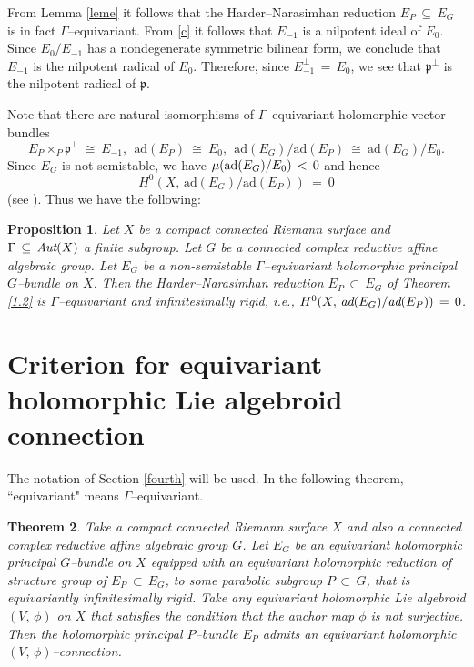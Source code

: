 \documentclass[12pt, reqno]{amsart}
\numberwithin{equation}{section}
\newtheorem{theorem}{Theorem}[section]
\newtheorem{proposition}[theorem]{Proposition}
\newcommand{\ad}{\textrm{ad}}
\begin{document}
{}From Lemma \ref{leme} it follows that the Harder--Narasimhan reduction $E_{P}\,\subseteq\, E_{G}$ is
in fact $\Gamma$--equivariant. From \eqref{c} it follows that $E_{-1}$ is a nilpotent ideal of $E_{0}$. Since
$E_{0}/E_{-1}$ has a nondegenerate symmetric bilinear form, we conclude that $E_{-1}$ is the nilpotent radical
of $E_{0}$. Therefore, since $E_{-1}^{\perp}\,=\,E_{0}$,
we see that $\mathfrak{p}^{\perp}$ is the nilpotent radical of $\mathfrak{p}$.

Note that there are natural isomorphisms of $\Gamma$--equivariant holomorphic
vector bundles $$E_{P}\times_{P}\mathfrak{p}^{\perp}\ \cong\ E_{-1},\ \ \ad(E_{P})
\ \cong\ E_{0},\ \ \ad(E_{G})/\ad(E_{P})\ \cong\ \text{ad}(E_G)/E_{0}.$$
Since $E_{G}$ is not semistable, we have $\mu({\rm ad}(E_G)/E_{0})\,<\,0$ and hence
$$H^{0}(X,\, \ad(E_{G})/\ad(E_{P}))\ =\ 0$$ (see \cite[Corollary 1]{AAB}).
Thus we have the following:

\begin{proposition}\label{3.3}
Let $X$ be a compact connected Riemann surface and $\Gamma\,\subseteq\, \emph{Aut}(X)$ a finite subgroup. Let
$G$ be a connected complex reductive affine algebraic group. Let $E_{G}$ be a non-semistable
$\Gamma$--equivariant holomorphic principal $G$--bundle on $X$. Then the Harder--Narasimhan reduction
$E_{P}\,\subset \,E_{G}$ of Theorem \ref{1.2} is $\Gamma$--equivariant and infinitesimally rigid, i.e.,
$H^{0}(X,\,\emph{ad}(E_{G})/\emph{ad}(E_{P}))\,=\,0$. 
\end{proposition}

\section{Criterion for equivariant holomorphic Lie algebroid connection}\label{final}

The notation of Section \ref{fourth} will be used. In the following theorem, ``equivariant" means 
$\Gamma$--equivariant.

\begin{theorem}\label{4.1}
Take a compact connected Riemann surface $X$ and also a connected complex reductive affine algebraic group
$G$. Let $E_{G}$ be an equivariant holomorphic principal $G$--bundle on $X$ equipped
with an equivariant holomorphic reduction of structure group of $E_{P}\,\subset\, E_{G}$, to some parabolic
subgroup $P\, \subset\, G$, that is equivariantly infinitesimally rigid. Take any equivariant holomorphic
Lie algebroid $(V,\,\phi)$ on $X$ that satisfies the condition that the anchor map $\phi$ is not
surjective. Then
the holomorphic principal $P$--bundle $E_{P}$ admits an equivariant holomorphic $(V,\,\phi)$--connection.
\end{theorem}
\end{document}
